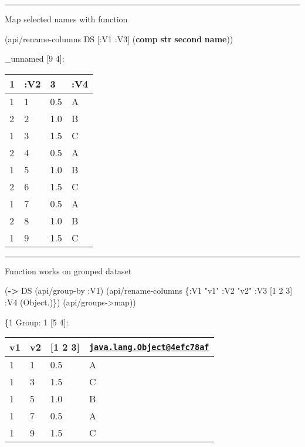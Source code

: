 \documentclass[]{article}
\newenvironment{Shaded}{\begin{snugshade}}{\end{snugshade}}
\newcommand{\AttributeTok}[1]{\textcolor[rgb]{0.77,0.63,0.00}{#1}}
\newcommand{\DecValTok}[1]{\textcolor[rgb]{0.00,0.00,0.81}{#1}}
\newcommand{\KeywordTok}[1]{\textcolor[rgb]{0.13,0.29,0.53}{\textbf{#1}}}
\newcommand{\NormalTok}[1]{#1}
\newcommand{\StringTok}[1]{\textcolor[rgb]{0.31,0.60,0.02}{#1}}
\begin{document}
\begin{center}\rule{0.5\linewidth}{0.5pt}\end{center}

Map selected names with function

\begin{Shaded}
\begin{Highlighting}[]
\NormalTok{(api/rename-columns DS [}\AttributeTok{:V1} \AttributeTok{:V3}\NormalTok{] (}\KeywordTok{comp} \KeywordTok{str} \KeywordTok{second} \KeywordTok{name}\NormalTok{))}
\end{Highlighting}
\end{Shaded}

\_unnamed {[}9 4{]}:

\begin{longtable}[]{@{}llll@{}}
\toprule
1 & :V2 & 3 & :V4\tabularnewline
\midrule
\endhead
1 & 1 & 0.5 & A\tabularnewline
2 & 2 & 1.0 & B\tabularnewline
1 & 3 & 1.5 & C\tabularnewline
2 & 4 & 0.5 & A\tabularnewline
1 & 5 & 1.0 & B\tabularnewline
2 & 6 & 1.5 & C\tabularnewline
1 & 7 & 0.5 & A\tabularnewline
2 & 8 & 1.0 & B\tabularnewline
1 & 9 & 1.5 & C\tabularnewline
\bottomrule
\end{longtable}

\begin{center}\rule{0.5\linewidth}{0.5pt}\end{center}

Function works on grouped dataset

\begin{Shaded}
\begin{Highlighting}[]
\NormalTok{(}\KeywordTok{->}\NormalTok{ DS}
\NormalTok{    (api/group-by }\AttributeTok{:V1}\NormalTok{)}
\NormalTok{    (api/rename-columns \{}\AttributeTok{:V1} \StringTok{"v1"}
                         \AttributeTok{:V2} \StringTok{"v2"}
                         \AttributeTok{:V3}\NormalTok{ [}\DecValTok{1} \DecValTok{2} \DecValTok{3}\NormalTok{]}
                         \AttributeTok{:V4}\NormalTok{ (Object.)\})}
\NormalTok{    (api/groups->map))}
\end{Highlighting}
\end{Shaded}

\{1 Group: 1 {[}5 4{]}:

\begin{longtable}[]{@{}llll@{}}
\toprule
v1 & v2 & {[}1 2 3{]} &
\href{mailto:java.lang.Object@4efc78af}{\nolinkurl{java.lang.Object@4efc78af}}\tabularnewline
\midrule
\endhead
1 & 1 & 0.5 & A\tabularnewline
1 & 3 & 1.5 & C\tabularnewline
1 & 5 & 1.0 & B\tabularnewline
1 & 7 & 0.5 & A\tabularnewline
1 & 9 & 1.5 & C\tabularnewline
\bottomrule
\end{longtable}
\end{document}
